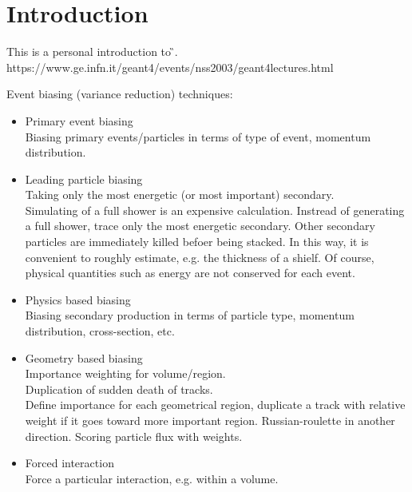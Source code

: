 \section{Introduction}
This is a personal introduction to \G{}.
https://www.ge.infn.it/geant4/events/nss2003/geant4lectures.html

Event biasing (variance reduction) techniques:
\begin{itemize}
    \item Primary event biasing	\\
	Biasing primary events/particles in terms of type of event, momentum
	distribution. 
    \item Leading particle biasing \\
	Taking only the most energetic (or most important) secondary. \\
	Simulating of a full shower is an expensive calculation. Instread of
	generating a full shower, trace only the most energetic secondary.
	Other secondary particles are immediately killed befoer being
	stacked. In this way, it is convenient to roughly estimate, e.g. the
	thickness of a shielf. Of course, physical quantities such as energy
	are not conserved for each event.
    \item Physics based biasing \\
	Biasing secondary production in terms of particle type, momentum
	distribution, cross-section, etc.
    \item Geometry based biasing \\
	Importance weighting for volume/region. \\
	Duplication of sudden death of tracks.	\\
	Define importance for each geometrical region, duplicate a track
	with relative weight if it goes toward more important region.
	Russian-roulette in another direction.
	Scoring particle flux with weights.
    \item Forced interaction \\
	Force a particular interaction, e.g. within a volume.
\end{itemize}
